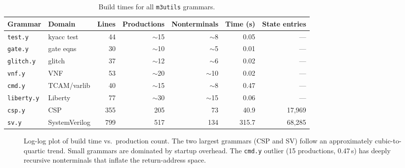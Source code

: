 \documentclass[11pt]{article}
\begin{document}
\begin{table}[h]
\centering
\begin{tabular}{@{}llrrrrr@{}}
\toprule
Grammar & Domain & Lines & Productions & Nonterminals & Time (s) & State entries \\
\midrule
\texttt{test.y}    & kyacc test   &  44 &  $\sim$15  &  $\sim$8  &    0.05 & --- \\
\texttt{gate.y}    & gate eqns    &  30 &  $\sim$10  &  $\sim$5  &    0.01 & --- \\
\texttt{glitch.y}  & glitch       &  37 &  $\sim$12  &  $\sim$6  &    0.02 & --- \\
\texttt{vnf.y}     & VNF          &  53 &  $\sim$20  & $\sim$10  &    0.02 & --- \\
\texttt{cmd.y}     & TCAM/varlib  &  40 &  $\sim$15  &  $\sim$8  &    0.47 & --- \\
\texttt{liberty.y} & Liberty      &  77 &  $\sim$30  & $\sim$15  &    0.06 & --- \\
\texttt{csp.y}     & CSP          & 355 &       205  &       73  &   40.9  & 17,969 \\
\texttt{sv.y}      & SystemVerilog& 799 &       517  &      134  &  315.7  & 68,285 \\
\bottomrule
\end{tabular}
\caption{Build times for all \texttt{m3utils} grammars.}
\label{tab:times}
\end{table}

\begin{figure}[h]
\centering
{}
\caption{Log-log plot of build time vs.\ production count.
  The two largest grammars (CSP and SV) follow an approximately
  cubic-to-quartic trend.  Small grammars are dominated by startup overhead.
  The \texttt{cmd.y} outlier (15 productions, 0.47\,s) has deeply
  recursive nonterminals that inflate the return-address space.}
\label{fig:scaling}
\end{figure}
\end{document}
